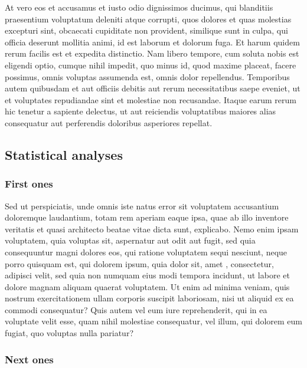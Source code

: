 \documentclass[a4paper,12pt]{article}
\begin{document}
At vero eos et accusamus et iusto odio dignissimos ducimus, qui blanditiis praesentium
voluptatum deleniti atque corrupti, quos dolores et quas molestias excepturi sint,
\citet{Hirzel_2003_PROC,Holand_1998,Looijen_1998_PhD} obcaecati cupiditate non provident,
similique sunt in culpa, qui officia deserunt mollitia animi, id est laborum et dolorum
fuga. Et harum quidem rerum facilis est et expedita distinctio. Nam libero tempore, cum
soluta nobis est eligendi optio, cumque nihil impedit, quo minus id, quod maxime placeat,
facere possimus, omnis voluptas assumenda est, omnis dolor repellendus. Temporibus autem
quibusdam et aut officiis debitis aut rerum necessitatibus saepe eveniet, ut et voluptates
repudiandae sint et molestiae non recusandae. Itaque earum rerum hic tenetur a sapiente
delectus, ut aut reiciendis voluptatibus maiores alias consequatur aut perferendis
doloribus asperiores repellat.

\subsection*{Statistical analyses}

\subsubsection*{First ones}

Sed ut perspiciatis, unde omnis iste natus error sit voluptatem accusantium doloremque
laudantium, totam rem aperiam eaque ipsa, quae ab illo inventore veritatis et quasi
architecto beatae vitae dicta sunt, explicabo. Nemo enim ipsam voluptatem, quia voluptas
sit, aspernatur aut odit aut fugit, sed quia consequuntur magni dolores eos, qui ratione
voluptatem sequi nesciunt, neque porro quisquam est, qui dolorem ipsum, quia dolor sit,
amet \citep{Ray_2005_Bk}, consectetur, adipisci velit, sed quia non numquam eius modi
tempora incidunt, ut labore et dolore magnam aliquam quaerat voluptatem. Ut enim ad minima
veniam, quis nostrum exercitationem ullam corporis suscipit laboriosam, nisi ut aliquid ex
ea commodi consequatur? Quis autem vel eum iure reprehenderit, qui in ea voluptate velit
esse, quam nihil molestiae consequatur, vel illum, qui dolorem eum fugiat, quo voluptas
nulla pariatur?

\subsubsection*{Next ones}
\end{document}
